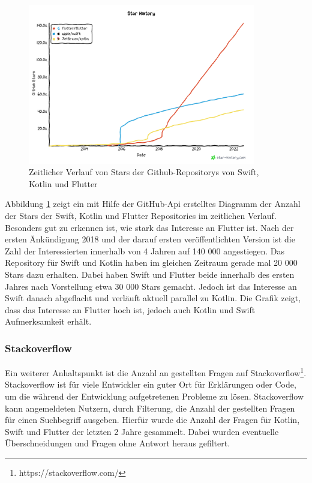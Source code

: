 \begin{figure}[ht]
  \centering
  \includegraphics[height=7cm,keepaspectratio]{images/star-history_programming languages.png} 
  \caption[Zeitlicher Verlauf von Stars der Github-Repositorys von Swift, Kotlin und Flutter]{Zeitlicher Verlauf von Stars der Github-Repositorys von Swift, Kotlin und Flutter\protect\footnotemark }
  \label{fig:star_history}
\end{figure}


Abbildung \ref{fig:star_history} zeigt ein mit Hilfe der GitHub-Api erstelltes Diagramm der Anzahl der Stars der Swift, Kotlin und Flutter Repositories im zeitlichen Verlauf. 
Besonders gut zu erkennen ist, wie stark das Interesse an Flutter ist. Nach der ersten Änkündigung 2018 und der darauf ersten veröffentlichten Version ist die Zahl der Interessierten innerhalb von 4 Jahren auf 140 000 angestiegen. Das Repository für Swift und Kotlin haben im gleichen Zeitraum gerade mal 20 000 Stars dazu erhalten. Dabei haben Swift und Flutter beide innerhalb des ersten Jahres nach Vorstellung etwa 30 000 Stars gemacht. Jedoch ist das Interesse an Swift danach abgeflacht und verläuft aktuell parallel zu Kotlin. Die Grafik zeigt, dass das Interesse an Flutter hoch ist, jedoch auch Kotlin und Swift Aufmerksamkeit erhält.

\subsubsection{Stackoverflow}
Ein weiterer Anhaltspunkt ist die Anzahl an gestellten Fragen auf Stackoverflow\footnote{https://stackoverflow.com/}. Stackoverflow ist für viele Entwickler ein guter Ort für Erklärungen oder Code, um die während der Entwicklung aufgetretenen Probleme zu lösen. Stackoverflow kann angemeldeten Nutzern, durch Filterung, die Anzahl der gestellten Fragen für einen Suchbegriff ausgeben. Hierfür wurde die Anzahl der Fragen für Kotlin, Swift und Flutter der letzten 2 Jahre gesammelt. Dabei wurden eventuelle Überschneidungen und Fragen ohne Antwort heraus gefiltert.

